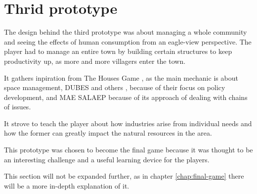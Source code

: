 \section{Thrid prototype}

The design behind the third prototype was about managing a whole community
and seeing the effects of human consumption from an eagle-view perspective.
The player had to manage an entire town by building certain structures to
keep productivity up, as more and more villagers enter the town.

It gathers inpiration from The Houses Game \cite{Taylor1983}, as
the main mechanic is about space management, DUBES and others \cite{Bots2007},
because of their focus on policy development, and MAE SALAEP \cite{Barnaud2007}
because of its approach of dealing with chains of issues.

It strove to teach the player about how industries arise from individual
needs and how the former can greatly impact the natural resources in the area.

This prototype was chosen to become the final game because it was thought
to be an interesting challenge and a useful learning device for the players.

This section will not be expanded further, as in chapter
\ref{chap:final-game} there will be a more in-depth explanation of it.
